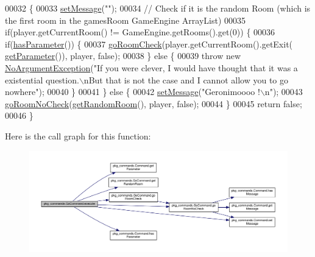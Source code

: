 \begin{DoxyCode}
00032                                                                                                            
                              \{
00033         \hyperlink{classpkg__commands_1_1Command_ae210ff216fe908b111ba1c988a963d13}{setMessage}(\textcolor{stringliteral}{""});
00034         \textcolor{comment}{// Check if it is the random Room (which is the first room in the gamesRoom GameEngine ArrayList)}
00035         \textcolor{keywordflow}{if}(player.getCurrentRoom() != GameEngine.getRooms().\textcolor{keyword}{get}(0)) \{
00036             \textcolor{keywordflow}{if}(\hyperlink{classpkg__commands_1_1Command_a02af95ab3f1898a66259ab7c177b6998}{hasParameter}()) \{
00037                 \hyperlink{classpkg__commands_1_1GoCommand_acbf1aa81fa5b1aef7cafb8b4e3ace3a9}{goRoomCheck}(player.getCurrentRoom().getExit(
      \hyperlink{classpkg__commands_1_1Command_a41c92d445be73ea9d62320c65efb8434}{getParameter}()), player, \textcolor{keyword}{false});
00038             \} \textcolor{keywordflow}{else} \{
00039                 \textcolor{keywordflow}{throw} \textcolor{keyword}{new} \hyperlink{classpkg__exceptions_1_1NoArgumentException}{NoArgumentException}(\textcolor{stringliteral}{"If you were clever, I would have thought
       that it was a existential question.\(\backslash\)nBut that is not the case and I cannot allow you to go nowhere"});
00040             \}
00041         \} \textcolor{keywordflow}{else} \{
00042             \hyperlink{classpkg__commands_1_1Command_ae210ff216fe908b111ba1c988a963d13}{setMessage}(\textcolor{stringliteral}{"Geronimoooo !\(\backslash\)n"});
00043             \hyperlink{classpkg__commands_1_1GoCommand_a210afbc5f3ef34d3ad5759d853c8f8c2}{goRoomNoCheck}(\hyperlink{classpkg__commands_1_1GoCommand_ae9ef6c18b0cbd0e0104261bdedf9a9d7}{getRandomRoom}(), player, \textcolor{keyword}{false});
00044         \}
00045         \textcolor{keywordflow}{return} \textcolor{keyword}{false};
00046     \}
\end{DoxyCode}


Here is the call graph for this function\-:\nopagebreak
\begin{figure}[H]
\begin{center}
\leavevmode
\includegraphics[width=350pt]{classpkg__commands_1_1GoCommand_a82e9a64a0fac612f788060a90c83f9b1_cgraph}
\end{center}
\end{figure}


